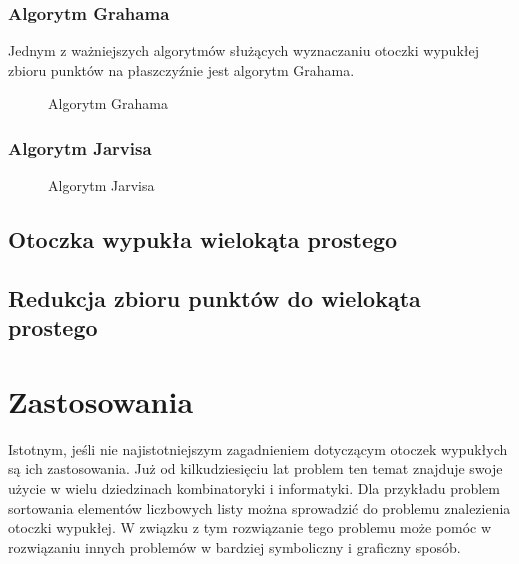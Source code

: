               
        \subsection{Algorytm Grahama}
        Jednym z ważniejszych algorytmów służących wyznaczaniu otoczki wypukłej zbioru punktów na płaszczyźnie jest algorytm Grahama.
        \newpage
        \begin{figure}[h!]
        		\begin{center}
    			
    			\caption{Algorytm Grahama}\label{fig:graham}
    			\end{center}
    			\mysource
    	\end{figure}
        \newpage
        \subsection{Algorytm Jarvisa}
        \begin{figure}[h!]
        		\begin{center}
    			
    			\caption{Algorytm Jarvisa}\label{fig:graham}
    			\end{center}
    			\mysource
    	\end{figure}
        
        
        \section{Otoczka wypukła wielokąta prostego}
        \cite{convexhullsimplepolygon}
        \section{Redukcja zbioru punktów do wielokąta prostego}
    \chapter{Zastosowania} 
    Istotnym, jeśli nie najistotniejszym zagadnieniem dotyczącym otoczek wypukłych są ich zastosowania. Już od kilkudziesięciu lat problem ten temat znajduje swoje użycie w wielu dziedzinach kombinatoryki i informatyki. Dla przykładu problem sortowania elementów liczbowych listy można sprowadzić do problemu znalezienia otoczki wypukłej. W związku z tym rozwiązanie tego problemu może pomóc w rozwiązaniu innych problemów w bardziej symboliczny i graficzny sposób.
